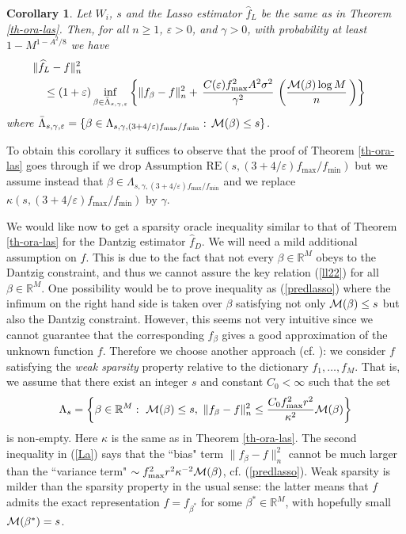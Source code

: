 \documentclass[dvips,aos]{imsart}
\numberwithin{equation}{section}
\theoremstyle{plain}
\newtheorem{cor}[thm]{Corollary}%
\def\sf{}
\def\wideth{\widehat}
\def\scm{{\cal M}}
\def\eps{\varepsilon}
\def\RR{\mathbb R}
\def\RE#1#2{$\text{RE}(#1,#2)$}
\begin{document}
\begin{cor}\label{cor2} Let  $W_i$, $s$ and the Lasso estimator
$\wideth{f}_L$ be the same as in Theorem \ref{th-ora-las}. Then,
for all $n\ge1$,  $\eps>0$, and $\gamma>0$, with probability at least
$1-M^{1-A^2/8}$ we have
\begin{equation*}%
\begin{split} &\hspace{-1em}\| \wideth f_L -f\|_n^2
\\
& \le (1+\eps)
\inf_{\beta\in\bar\Lambda_{s,\gamma,\eps}}\left\{\| {\sf
f}_\beta -f \|_n^2 + \,\frac{C(\eps)f_{\max}^2A^2
\sigma^2}{\gamma^2}\, \left(\frac{\scm(\beta)\log
M}{n}\,\right)\right\}\,
\end{split}
\end{equation*}
where $\bar\Lambda_{s,\gamma,\eps}
=\{\beta\in\Lambda_{s,\gamma,(3+4/\eps)f_{\max}/f_{\min}}:\,\scm(\beta)\le
s\}$.
\end{cor}
To obtain this corollary it suffices to observe that the proof of
Theorem \ref{th-ora-las} goes through if we drop Assumption \RE
s{(3+4/\eps)f_{\max}/f_{\min}} but we assume instead that
$\beta\in\Lambda_{s,\gamma,(3+4/\eps)f_{\max}/f_{\min} }$ and we
replace $\kappa(s,(3+4/\eps)f_{\max}/f_{\min})$ by $\gamma$.




We would like now to get a sparsity oracle inequality similar to
that of Theorem \ref{th-ora-las} for the Dantzig estimator
$\wideth{f}_D$. We will need a mild additional assumption on $f$.
This is due to the fact that not every $\beta\in\RR^M$ obeys to
the Dantzig constraint, and thus we cannot assure the key relation
(\ref{ll22}) for all $\beta\in\RR^M$. One possibility would be to
prove inequality as (\ref{predlasso}) where the infimum on the right
hand side is taken over $\beta$ satisfying not only $\scm(\beta)\le
s$ but also the Dantzig constraint. However, this seems not very
intuitive since we cannot guarantee that the corresponding ${\sf
f}_\beta$ gives a good approximation of the unknown function $f$.
Therefore we choose another approach (cf. \cite{btw06b}): we
consider $f$ satisfying the {\it weak sparsity} property relative to
the dictionary $f_1,\dots,f_M$. That is, we assume that there exist
an integer $s$ and constant $C_0<\infty$ such that the set
\begin{equation}\label{La}
%
\Lambda_s = \left\{ \beta \in \RR^M: \ \scm(\beta)\le s,  \ \| {\sf
f}_\beta - f\|_n^2 \le \frac{C_0 f_{\max}^2r^2}{\kappa^2}
\scm(\beta) \right\}
\end{equation}
%
is non-empty. Here $\kappa$ is the same as in Theorem
\ref{th-ora-las}. The second inequality in (\ref{La}) says that the
``bias" term $\| {\sf f}_\beta - f\|_n^2$ cannot be much larger than
the ``variance term" $\sim{f_{\max}^2r^2}\kappa^{-2} \scm(\beta)$,
cf. (\ref{predlasso}). Weak sparsity is milder than the sparsity
property in the usual sense: the latter means that $f$ admits the
exact representation $f={\sf f}_{\beta^*}$ for some $\beta^*\in
\RR^M$, with hopefully small $\scm(\beta^*)= s$.\\
\end{document}
